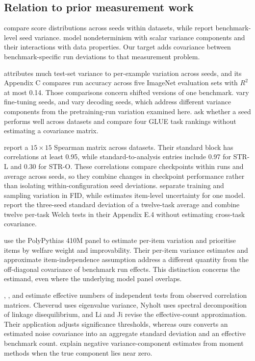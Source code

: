 \subsection{Relation to prior measurement work}
\citet{reimers2017} compare score distributions across seeds within datasets, while \citet{madaan2024} report benchmark-level seed variance. \citet{hagmann2023} model nondeterminism with scalar variance components and their interactions with data properties. Our target adds covariance between benchmark-specific run deviations to that measurement problem.

\citet{jordan2024} attributes much test-set variance to per-example variation across seeds, and its Appendix C compares run accuracy across five ImageNet evaluation sets with $R^2$ at most 0.14. Those comparisons concern shifted versions of one benchmark. \citet{bui2025} vary fine-tuning seeds, and \citet{hochlehnert2025} vary decoding seeds, which address different variance components from the pretraining-run variation examined here. \citet[Section 4.3]{dodge2020} ask whether a seed performs well across datasets and compare four GLUE task rankings without estimating a covariance matrix.

\citet[Figure 3]{zhou2020} report a $15\times15$ Spearman matrix across datasets. Their standard block has correlations at least 0.95, while standard-to-analysis entries include 0.97 for STR-L and 0.30 for STR-O. These correlations compare checkpoints within runs and average across seeds, so they combine changes in checkpoint performance rather than isolating within-configuration seed deviations. \citet{dufour2026} separate training and sampling variation in FID, while \citet{miller2024} estimates item-level uncertainty for one model. \citet{zhao2026} report the three-seed standard deviation of a twelve-task average and combine twelve per-task Welch tests in their Appendix E.4 without estimating cross-task covariance.

\citet{haupt2026} use the PolyPythias 410M panel to estimate per-item variation and prioritise items by welfare weight and improvability. Their per-item variance estimates and approximate item-independence assumption address a different quantity from the off-diagonal covariance of benchmark run effects. This distinction concerns the estimand, even where the underlying model panel overlaps.

\citet{cheverud2001}, \citet{nyholt2004}, and \citet{li2005} estimate effective numbers of independent tests from observed correlation matrices. Cheverud uses eigenvalue variance, Nyholt uses spectral decomposition of linkage disequilibrium, and Li and Ji revise the effective-count approximation. Their application adjusts significance thresholds, whereas ours converts an estimated noise covariance into an aggregate standard deviation and an effective benchmark count. \citet{searle1992} explain negative variance-component estimates from moment methods when the true component lies near zero.


